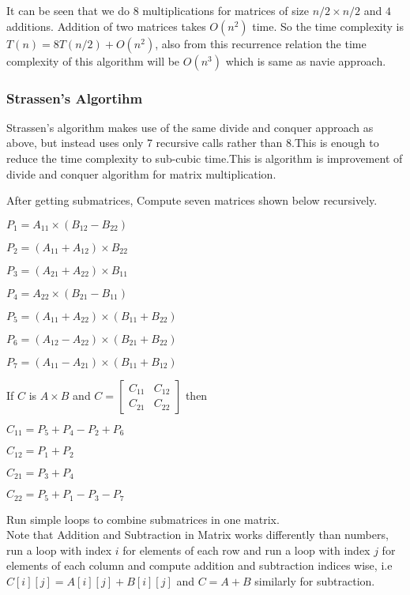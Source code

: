 \documentclass[conference]{IEEEtran}
\begin{document}
It can be seen that we do 8 multiplications for matrices of size $n/2 \times n/2$ and $4$ additions. Addition of two matrices takes $O(n^2)$ time. So the time complexity is \(T(n) = 8T(n/2) + O(n^2) \), also from this recurrence relation the time complexity of this algorithm will be $O(n^3)$ which is same as navie approach.
\subsubsection{Strassen's Algortihm}

Strassen’s algorithm makes use of the same divide and conquer approach as above, but instead uses only 7 recursive calls rather than 8.This is enough to reduce the time complexity to sub-cubic time.This is algorithm is improvement of divide and conquer algorithm for matrix multiplication.

After getting submatrices, Compute seven matrices shown below recursively.

\(P_1 = A_{11}\times(B_{12}-B_{22})\) 

\(P_2 = (A_{11}+A_{12})\times B_{22}\) 

\(P_3 = (A_{21}+A_{22})\times B_{11}\) 

\(P_4 = A_{22}\times(B_{21}-B_{11})\) 

\(P_5 = (A_{11}+A_{22})\times(B_{11}+B_{22})\) 

\(P_6 = (A_{12}-A_{22})\times(B_{21}+B_{22})\) 

\(P_7 = (A_{11}-A_{21})\times(B_{11}+B_{12})\) 

If $C$ is $A\times B$ and \(
C = \begin{bmatrix}
C_{11} & C_{12}\\
C_{21} & C_{22}
\end{bmatrix}
\)
then

\(C_{11} = P_5 + P_4 - P_2 + P_6\) 

\(C_{12} = P_1+ P_2\) 

\(C_{21} = P_3 + P_4\) 

\(C_{22} = P_5 + P_1 - P_3 - P_7\)

Run simple loops to combine submatrices in one matrix.
\\

Note that Addition and Subtraction in Matrix works differently than numbers, run a loop with index $i$ for elements of each row and run a loop with index $j$ for elements of each column and compute addition and subtraction indices wise, i.e $C[i][j] = A[i][j]+B[i][j]$ and $C = A+B$ similarly for subtraction.
\end{document}
